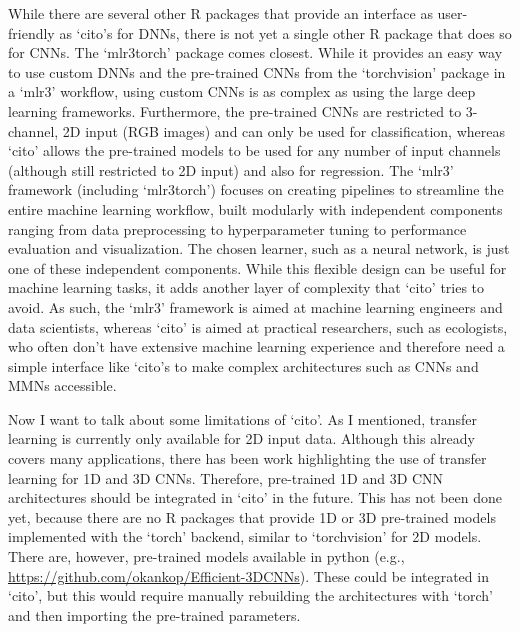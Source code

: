 \documentclass[12pt,twoside]{scrreport}
\newcommand{\pkg}[1]{`#1'}
\begin{document}
While there are several other R packages that provide an interface as user-friendly as \pkg{cito}s for DNNs, there is not yet a single other R package that does so for CNNs. The \pkg{mlr3torch} \citep{fischerMlr3torchDeepLearning2024} package comes closest. While it provides an easy way to use custom DNNs and the pre-trained CNNs from the \pkg{torchvision} package in a \pkg{mlr3} \citep{mlr3} workflow, using custom CNNs is as complex as using the large deep learning frameworks. Furthermore, the pre-trained CNNs are restricted to 3-channel, 2D input (RGB images) and can only be used for classification, whereas \pkg{cito} allows the pre-trained models to be used for any number of input channels (although still restricted to 2D input) and also for regression. The \pkg{mlr3} framework (including \pkg{mlr3torch}) focuses on creating pipelines to streamline the entire machine learning workflow, built modularly with independent components ranging from data preprocessing to hyperparameter tuning to performance evaluation and visualization. The chosen learner, such as a neural network, is just one of these independent components. While this flexible design can be useful for machine learning tasks, it adds another layer of complexity that \pkg{cito} tries to avoid.  As such, the \pkg{mlr3} framework is aimed at machine learning engineers and data scientists, whereas \pkg{cito} is aimed at practical researchers, such as ecologists, who often don't have extensive machine learning experience and therefore need a simple interface like \pkg{cito}s to make complex architectures such as CNNs and MMNs accessible.

Now I want to talk about some limitations of \pkg{cito}. As I mentioned, transfer learning is currently only available for 2D input data. Although this already covers many applications, there has been work highlighting the use of transfer learning for 1D \citep[e.g., ][]{fawazTransferLearningTime2018, weimannTransferLearningECG2021a} and 3D \citep[e.g., ][]{kopukluResourceEfficient3D2021a, haraCanSpatiotemporal3D2018} CNNs. Therefore, pre-trained 1D and 3D CNN architectures should be integrated in \pkg{cito} in the future. This has not been done yet, because there are no R packages that provide 1D or 3D pre-trained models implemented with the \pkg{torch} backend, similar to \pkg{torchvision} for 2D models. There are, however, pre-trained models available in python (e.g., \url{https://github.com/okankop/Efficient-3DCNNs}). These could be integrated in \pkg{cito}, but this would require manually rebuilding the architectures with \pkg{torch} and then importing the pre-trained parameters.
\end{document}
